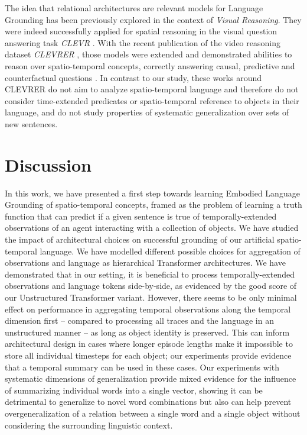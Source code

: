 The idea that relational architectures are relevant models for Language Grounding has been previously explored in the context of \textit{Visual Reasoning}. They were indeed successfully applied for spatial reasoning in the visual question answering task \textit{CLEVR} \cite{santoro2017simple}. With the recent publication of the video reasoning dataset \textit{CLEVRER} \cite{yi2020clevrer}, those models were extended and demonstrated abilities to reason over spatio-temporal concepts, correctly answering causal, predictive and counterfactual questions \cite{ding2020objectbased}. In contrast to our study, these works around CLEVRER do not aim to analyze spatio-temporal language and therefore do not consider time-extended predicates or spatio-temporal reference to objects in their language, and do not study properties of systematic generalization over sets of new sentences.

\section{Discussion}

In this work, we have presented a first step towards learning Embodied Language Grounding of spatio-temporal concepts, framed as the problem of learning a truth function that can predict if a given sentence is true of temporally-extended observations of an agent interacting with a collection of objects. We have studied the impact of architectural choices on successful grounding of our artificial spatio-temporal language. We have modelled different possible choices for aggregation of observations and language as hierarchical Transformer architectures. We have demonstrated that in our setting, it is beneficial to process temporally-extended observations and language tokens side-by-side, as evidenced by the good score of our Unstructured Transformer variant. However, there seems to be only minimal effect on performance in aggregating temporal observations along the temporal dimension first -- compared to processing all traces and the language in an unstructured manner -- as long as object identity is preserved. This can inform architectural design in cases where longer episode lengths make it impossible to store all individual timesteps for each object; our experiments provide evidence that a temporal summary can be used in these cases. Our experiments with systematic dimensions of generalization provide mixed evidence for the influence of summarizing individual words into a single vector, showing it can be detrimental to generalize to novel word combinations but also can help prevent overgeneralization of a relation between a single word and a single object without considering the surrounding linguistic context.

